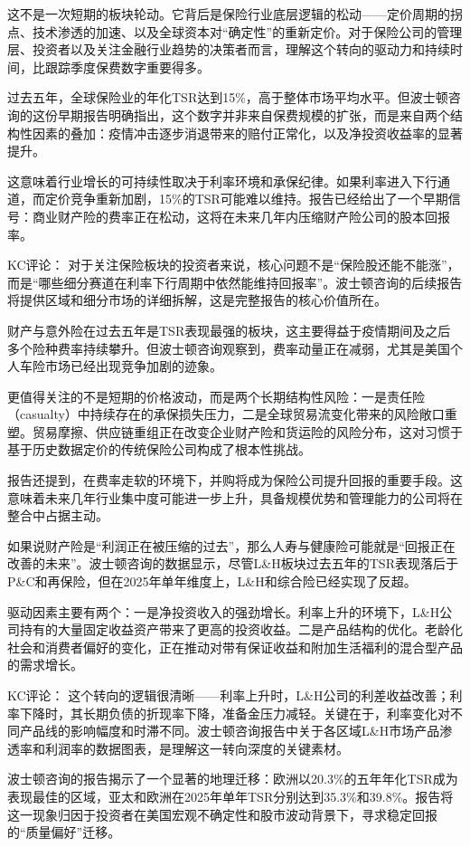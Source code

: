 \documentclass[11pt]{ctexart}
\begin{document}
这不是一次短期的板块轮动。它背后是保险行业底层逻辑的松动——定价周期的拐点、技术渗透的加速、以及全球资本对“确定性”的重新定价。对于保险公司的管理层、投资者以及关注金融行业趋势的决策者而言，理解这个转向的驱动力和持续时间，比跟踪季度保费数字重要得多。

过去五年，全球保险业的年化TSR达到15\%，高于整体市场平均水平。但波士顿咨询的这份早期报告明确指出，这个数字并非来自保费规模的扩张，而是来自两个结构性因素的叠加：疫情冲击逐步消退带来的赔付正常化，以及净投资收益率的显著提升。

这意味着行业增长的可持续性取决于利率环境和承保纪律。如果利率进入下行通道，而定价竞争重新加剧，15\%的TSR可能难以维持。报告已经给出了一个早期信号：商业财产险的费率正在松动，这将在未来几年内压缩财产险公司的股本回报率。

KC评论： 对于关注保险板块的投资者来说，核心问题不是“保险股还能不能涨”，而是“哪些细分赛道在利率下行周期中依然能维持回报率”。波士顿咨询的后续报告将提供区域和细分市场的详细拆解，这是完整报告的核心价值所在。

财产与意外险在过去五年是TSR表现最强的板块，这主要得益于疫情期间及之后多个险种费率持续攀升。但波士顿咨询观察到，费率动量正在减弱，尤其是美国个人车险市场已经出现竞争加剧的迹象。

更值得关注的不是短期的价格波动，而是两个长期结构性风险：一是责任险（casualty）中持续存在的承保损失压力，二是全球贸易流变化带来的风险敞口重塑。贸易摩擦、供应链重组正在改变企业财产险和货运险的风险分布，这对习惯于基于历史数据定价的传统保险公司构成了根本性挑战。

报告还提到，在费率走软的环境下，并购将成为保险公司提升回报的重要手段。这意味着未来几年行业集中度可能进一步上升，具备规模优势和管理能力的公司将在整合中占据主动。

如果说财产险是“利润正在被压缩的过去”，那么人寿与健康险可能就是“回报正在改善的未来”。波士顿咨询的数据显示，尽管L\&H板块过去五年的TSR表现落后于P\&C和再保险，但在2025年单年维度上，L\&H和综合险已经实现了反超。

驱动因素主要有两个：一是净投资收入的强劲增长。利率上升的环境下，L\&H公司持有的大量固定收益资产带来了更高的投资收益。二是产品结构的优化。老龄化社会和消费者偏好的变化，正在推动对带有保证收益和附加生活福利的混合型产品的需求增长。

KC评论： 这个转向的逻辑很清晰——利率上升时，L\&H公司的利差收益改善；利率下降时，其长期负债的折现率下降，准备金压力减轻。关键在于，利率变化对不同产品线的影响幅度和时滞不同。波士顿咨询报告中关于各区域L\&H市场产品渗透率和利润率的数据图表，是理解这一转向深度的关键素材。

波士顿咨询的报告揭示了一个显著的地理迁移：欧洲以20.3\%的五年年化TSR成为表现最佳的区域，亚太和欧洲在2025年单年TSR分别达到35.3\%和39.8\%。报告将这一现象归因于投资者在美国宏观不确定性和股市波动背景下，寻求稳定回报的“质量偏好”迁移。
\end{document}
